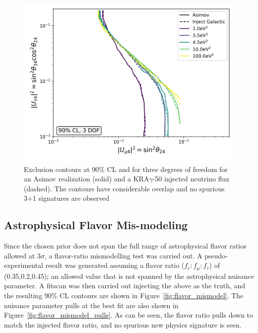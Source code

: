 \documentclass[main.tex]{subfiles}
\begin{document}
\begin{figure}
    \centering
    \includegraphics[width=0.7\linewidth]{figures/double_galactic_mismodel_fix_Realization_galactic_focus_sterile_0_cl0.9_dof3.png}
    \caption{Exclusion contours at 90\% CL and for three degrees of freedom for an Asimov realization (solid) and a KRA$\gamma$-50 injected neutrino flux (dashed). The contours have considerable overlap and no spurious 3+1 signatures are observed}\label{fig:galaxy}
\end{figure}

\subsection{Astrophysical Flavor Mis-modeling}

Since the chosen prior does not span the full range of astrophysical flavor ratios allowed at $3\sigma$, a flavor-ratio mismodelling test was carried out.
A pseudo-experimental result was generated assuming a flavor ratio ($f_{e}:f_{\mu}:f_{\tau}$) of (0.35,0.2,0.45); an allowed value that is not spanned by the astrophysical nuisance parameter. 
A fitscan was then carried out injecting the above as the truth, and the resulting 90\% CL contours are shown in Figure~\ref{fig:flavor_mismodel}. The nuisance parameter pulls at the best fit are also shown in Figure~\ref{fig:flavor_mismodel_pulls}.
As can be seen, the flavor ratio pulls down to match the injected flavor ratio, and no spurious new physics signature is seen. 
\end{document}
